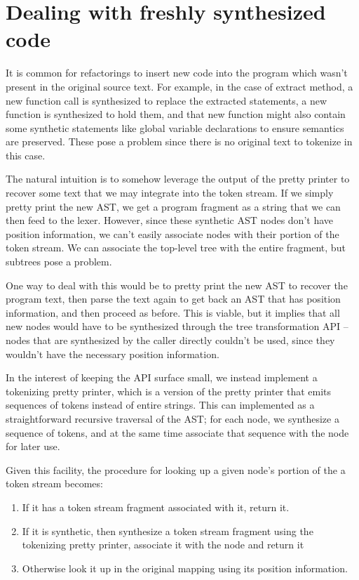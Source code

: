 \section{Dealing with freshly synthesized code}

It is common for refactorings to insert new code into the program which wasn't
present in the original source text. For example, in the case of extract
method, a new function call is synthesized to replace the extracted statements,
a new function is synthesized to hold them, and that new function might also
contain some synthetic statements like global variable declarations to ensure
semantics are preserved. These pose a problem since there is no original text
to tokenize in this case.

The natural intuition is to somehow leverage the output of the pretty printer
to recover some text that we may integrate into the token stream. If we simply
pretty print the new AST, we get a program fragment as a string that we can
then feed to the lexer. However, since these synthetic AST nodes don't have
position information, we can't easily associate nodes with their portion of the
token stream. We can associate the top-level tree with the entire fragment, but
subtrees pose a problem.

One way to deal with this would be to pretty print the new AST to recover the
program text, then parse the text again to get back an AST that has position
information, and then proceed as before. This is viable, but it implies that
all new nodes would have to be synthesized through the tree transformation API
-- nodes that are synthesized by the caller directly couldn't be used, since
they wouldn't have the necessary position information.

In the interest of keeping the API surface small, we instead implement a
tokenizing pretty printer, which is a version of the pretty printer that emits
sequences of tokens instead of entire strings. This can implemented as a
straightforward recursive traversal of the AST; for each node, we synthesize a
sequence of tokens, and at the same time associate that sequence with the node
for later use.

Given this facility, the procedure for looking up a given node's portion of the
a token stream becomes:

\begin{enumerate}
  \item If it has a token stream fragment associated with it, return it.
  \item If it is synthetic, then synthesize a token stream fragment using the
  tokenizing pretty printer, associate it with the node and return it
  \item Otherwise look it up in the original mapping using its position information.
\end{enumerate}

